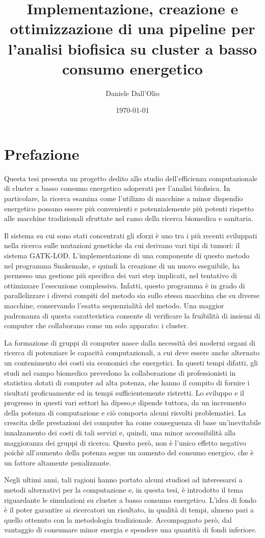 \documentclass[12pt, a4paper]{report}
\title{Implementazione, creazione e ottimizzazione di una pipeline per l'analisi biofisica su cluster a basso consumo energetico}
\author{Daniele Dall'Olio}
\date{\today}
\begin{document}
\section*{Prefazione}
Questa tesi presenta un progetto dedito allo studio dell'efficienza computazionale di cluster a basso consumo energetico adoperati per l'analisi biofisica.
In particolare, la ricerca esamina come l'utilizzo di macchine a minor dispendio energetico possano essere più convenienti e potenzialemente più potenti rispetto alle macchine tradizionali sfruttate nel ramo della ricerca biomedica e sanitaria.


Il sistema su cui sono stati concentrati gli sforzi è uno tra i più recenti sviluppati nella ricerca sulle mutazioni genetiche da cui derivano vari tipi di tumori: il sistema GATK-LOD.
L'implementazione di una componente di questo metodo nel programma Snakemake, e quindi la creazione di un nuovo eseguibile, ha permesso una gestione più specifica dei vari step implicati, nel tentativo di ottimizzare l'esecuzione complessiva. 
Infatti, questo programma è in grado di parallelizzare i diversi compiti del metodo sia sullo stessa macchina che su diverse macchine, conservando l'esatta sequenzialità del metodo.
Una maggior padronanza di questa caratteristica consente di verificare la fruibilità di insiemi di computer che collaborano come un solo apparato: i cluster.

La formazione di gruppi di computer nasce dalla necessità dei moderni organi di ricerca di potenziare le capacità computazionali, a cui deve essere anche alternato un contenimento dei costi sia economici che energetici.
In questi tempi difatti, gli studi nel campo biomedico prevedono la collaborazione di professionisti in statistica dotati di computer ad alta potenza, che hanno il compito di fornire i risultati proficuamente ed in tempi sufficientemente ristretti.
Lo sviluppo e il progresso in questi vari settori ha dipeso,e dipende tuttora, da un incremento della potenza di computazione e ciò comporta alcuni risvolti problematici.
La crescita delle prestazioni dei computer ha come conseguenza di base un'inevitabile innalzamento dei costi di tali servizi e, quindi, una minor accessibilità alla maggioranza dei gruppi di ricerca.
Questo però, non è l'unico effetto negativo poichè all'aumento della potenza segue un aumento del consumo energico, che è un fattore altamente penalizzante.

Negli ultimi anni, tali ragioni hanno portato alcuni studiosi ad interessarsi a metodi alternativi per la computazione e, in questa tesi, è introdotto il tema riguardante le simulazioni su cluster a basso consumo energetico.
L'idea di fondo è il poter garantire ai ricercatori un risultato, in qualità di tempi, almeno pari a quello ottenuto con la metodologia tradizionale.
Accompagnato però, dal vantaggio di consumare minor energia e spendere una quantità di fondi inferiore.
\end{document}
